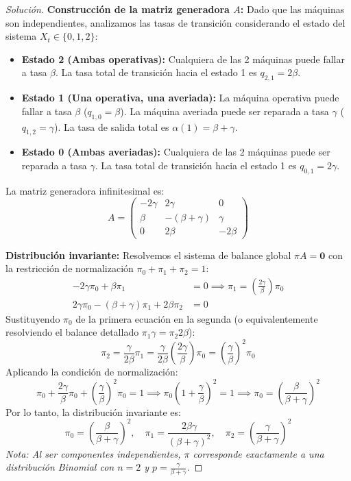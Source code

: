 \documentclass[10pt,a4paper]{article}
\begin{document}
\begin{proof}[Solución]
    \textbf{Construcción de la matriz generadora $A$:}
    Dado que las máquinas son independientes, analizamos las tasas de transición considerando el estado del sistema $X_t \in \{0,1,2\}$:
    \begin{itemize}
        \item \textbf{Estado 2 (Ambas operativas):} Cualquiera de las 2 máquinas puede fallar a tasa $\beta$. La tasa total de transición hacia el estado 1 es $q_{2,1} = 2\beta$.
        \item \textbf{Estado 1 (Una operativa, una averiada):} La máquina operativa puede fallar a tasa $\beta$ ($q_{1,0} = \beta$). La máquina averiada puede ser reparada a tasa $\gamma$ ($q_{1,2} = \gamma$). La tasa de salida total es $\alpha(1) = \beta + \gamma$.
        \item \textbf{Estado 0 (Ambas averiadas):} Cualquiera de las 2 máquinas puede ser reparada a tasa $\gamma$. La tasa total de transición hacia el estado 1 es $q_{0,1} = 2\gamma$.
    \end{itemize}
    La matriz generadora infinitesimal es:
    \[ A = \begin{pmatrix} 
    -2\gamma & 2\gamma & 0 \\ 
    \beta & -(\beta+\gamma) & \gamma \\ 
    0 & 2\beta & -2\beta 
    \end{pmatrix} \]

    \textbf{Distribución invariante:}
    Resolvemos el sistema de balance global $\pi A = \mathbf{0}$ con la restricción de normalización $\pi_0 + \pi_1 + \pi_2 = 1$:
    \begin{align*}
        -2\gamma \pi_0 + \beta \pi_1 &= 0 \implies \pi_1 = \left(\frac{2\gamma}{\beta}\right) \pi_0 \\
        2\gamma \pi_0 - (\beta+\gamma)\pi_1 + 2\beta \pi_2 &= 0 
    \end{align*}
    Sustituyendo $\pi_0$ de la primera ecuación en la segunda (o equivalentemente resolviendo el balance detallado $\pi_1 \gamma = \pi_2 2\beta$):
    \[ \pi_2 = \frac{\gamma}{2\beta} \pi_1 = \frac{\gamma}{2\beta} \left(\frac{2\gamma}{\beta}\right) \pi_0 = \left(\frac{\gamma}{\beta}\right)^2 \pi_0 \]
    Aplicando la condición de normalización:
    \[ \pi_0 + \frac{2\gamma}{\beta} \pi_0 + \left(\frac{\gamma}{\beta}\right)^2 \pi_0 = 1 \implies \pi_0 \left( 1 + \frac{\gamma}{\beta} \right)^2 = 1 \implies \pi_0 = \left(\frac{\beta}{\beta+\gamma}\right)^2 \]
    Por lo tanto, la distribución invariante es:
    \[ \pi_0 = \left(\frac{\beta}{\beta+\gamma}\right)^2, \quad \pi_1 = \frac{2\beta\gamma}{(\beta+\gamma)^2}, \quad \pi_2 = \left(\frac{\gamma}{\beta+\gamma}\right)^2 \]
    \textit{Nota: Al ser componentes independientes, 
    $\pi$ corresponde exactamente a una distribución Binomial con $n=2$ y $p=\frac{\gamma}{\beta+\gamma}$.}


\end{proof}
\end{document}
